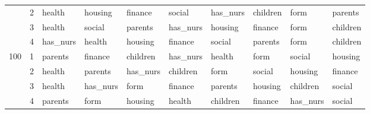 \begin{table}[htbp]
\begin{tabular}{llllllllll}
 & 2 & health & housing & finance & social & has_nurs & children & form & parents \\
 & 3 & health & social & parents & has_nurs & housing & finance & form & children \\
 & 4 & has_nurs & health & housing & finance & social & parents & form & children \\
\multirow[c]{4}{*}{100} & 1 & parents & finance & children & has_nurs & health & form & social & housing \\
 & 2 & health & parents & has_nurs & children & form & social & housing & finance \\
 & 3 & health & has_nurs & form & finance & parents & housing & children & social \\
 & 4 & parents & form & housing & health & children & finance & has_nurs & social \\
\bottomrule
\end{tabular}
\end{table}
